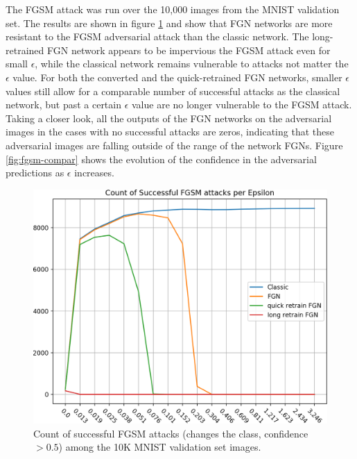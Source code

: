 \documentclass[12pt,oneside]{CUNY_PhD}
\begin{document}
The FGSM attack was run over the 10,000 images from the MNIST validation set. The results are shown in figure \ref{fig:fgsm-counts} and show that FGN networks are more resistant to the FGSM adversarial attack than the classic network. The long-retrained FGN network appears to be impervious the FGSM attack even for small $\epsilon$, while the classical network remains vulnerable to attacks not matter the $\epsilon$ value. For both the converted and the quick-retrained FGN networks, smaller $\epsilon$ values still allow for a comparable number of successful attacks as the classical network, but past a certain $\epsilon$ value are no longer vulnerable to the FGSM attack. Taking a closer look, all the outputs of the FGN networks on the adversarial images in the cases with no successful attacks are zeros, indicating that these adversarial images are falling outside of the range of the network FGNs. Figure \ref{fig:fgsm-compar} shows the evolution of the confidence in the adversarial predictions as $\epsilon$ increases.
\begin{figure}[!t]
    \centering
        \includegraphics[width=\textwidth]{images/successful-attacks-comparisons/succesful_fgsm_count.png}
    \caption{Count of successful FGSM attacks (changes the class, confidence$>0.5$) among the 10K MNIST validation set images.}
    \label{fig:fgsm-counts}
\end{figure}
\end{document}
